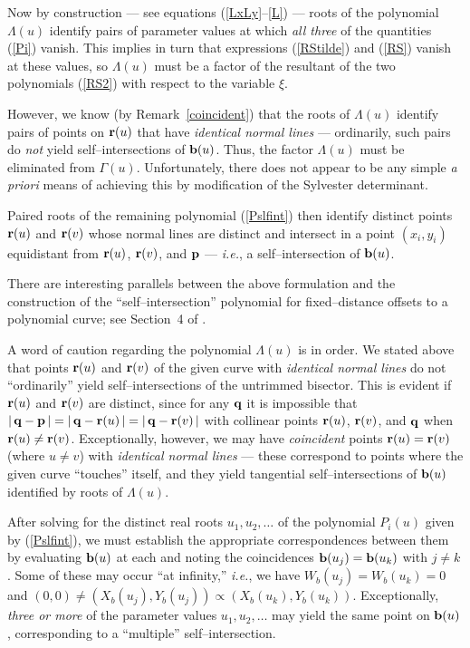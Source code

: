 Now by construction --- see equations (\ref{LxLy}--\ref{L}) --- roots
of the polynomial $\Lambda(u)$ identify pairs of parameter values at
which {\it all three\/} of the quantities (\ref{Pi}) vanish. This
implies in turn that expressions (\ref{RStilde}) and (\ref{RS}) vanish
at these values, so $\Lambda(u)$ must be a factor of the resultant
of the two polynomials (\ref{RS2}) with respect to the variable $\xi$.

However, we know (by Remark~\ref{coincident}) that the roots of
$\Lambda(u)$ identify pairs of points on ${\bf r}(u)$ that have {\it
identical normal lines\/} --- ordinarily, such pairs do {\it not\/}
yield self--intersections of ${\bf b}(u)$. Thus, the factor $\Lambda(u)$
must be eliminated from $\Gamma(u)$. Unfortunately, there does not appear
to be any simple {\it a priori\/} means of achieving this by modification
of the Sylvester determinant.

Paired roots of the remaining polynomial (\ref{Pslfint}) then identify
distinct points ${\bf r}(u)$ and ${\bf r}(v)$ whose normal lines are
distinct and intersect in a point $(x_i,y_i)$ equidistant from ${\bf r}
(u)$, ${\bf r}(v)$, and ${\bf p}$ --- {\it i.e.}, a self--intersection
of ${\bf b}(u)$. \QED

There are interesting parallels between the above formulation and the
construction of the ``self--intersection'' polynomial for fixed--distance
offsets to a polynomial curve; see Section~4 of \cite{farouki90b}.

\begin{rmk}
{\rm
A word of caution regarding the polynomial $\Lambda(u)$ is in order.
We stated above that points ${\bf r}(u)$ and ${\bf r}(v)$ of the
given curve with {\it identical normal lines\/} do not ``ordinarily''
yield self--intersections of the untrimmed bisector. This is evident
if ${\bf r}(u)$ and ${\bf r}(v)$ are distinct, since for any ${\bf q}$
it is impossible that $|\,{\bf q}-{\bf p}\,|=|\,{\bf q}-{\bf r}(u)\,|=
|\,{\bf q}-{\bf r}(v)\,|$ with collinear points ${\bf r}(u)$, ${\bf r}
(v)$, and ${\bf q}$ when ${\bf r}(u)\not={\bf r}(v)$. Exceptionally,
however, we may have {\it coincident\/} points ${\bf r}(u)={\bf r}
(v)$ (where $u\not=v$) with {\it identical normal lines\/} --- these
correspond to points where the given curve ``touches'' itself, and
they yield tangential self--intersections of ${\bf b}(u)$ identified
by roots of $\Lambda(u)$.
}
\end{rmk}

After solving for the distinct real roots $u_1,u_2,\ldots$ of the
polynomial $P_i(u)$ given by (\ref{Pslfint}), we must establish the
appropriate correspondences between them by evaluating ${\bf b}(u)$
at each and noting the coincidences ${\bf b}(u_j)={\bf b}(u_k)$ with
$j\not=k$. Some of these may occur ``at infinity,'' {\it i.e.}, we
have $W_b(u_j)=W_b(u_k)=0$ and $(0,0)\not=(X_b(u_j),Y_b(u_j))\propto
(X_b(u_k),Y_b(u_k))$. Exceptionally, {\it three or more\/} of the
parameter values $u_1,u_2,\ldots$ may yield the same point on
${\bf b}(u)$, corresponding to a ``multiple'' self--intersection.

